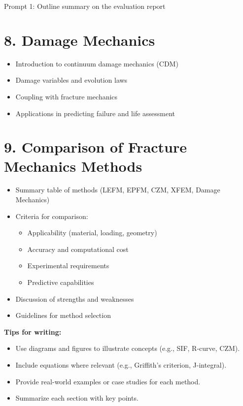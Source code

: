\documentclass[12pt]{article}
\begin{document}
\begin{summarybox}{Prompt 1: Outline summary on the evaluation report}
\section*{8. Damage Mechanics }
\begin{itemize}
    \item Introduction to continuum damage mechanics (CDM)
    \item Damage variables and evolution laws
    \item Coupling with fracture mechanics
    \item Applications in predicting failure and life assessment
\end{itemize}

\section*{9. Comparison of Fracture Mechanics Methods }
\begin{itemize}
    \item Summary table of methods (LEFM, EPFM, CZM, XFEM, Damage Mechanics)
    \item Criteria for comparison:
    \begin{itemize}
        \item Applicability (material, loading, geometry)
        \item Accuracy and computational cost
        \item Experimental requirements
        \item Predictive capabilities
    \end{itemize}
    \item Discussion of strengths and weaknesses
    \item Guidelines for method selection
\end{itemize}
\vspace{1em}
\textbf{Tips for writing:}
\vspace{1em}
\begin{itemize}
    \item Use diagrams and figures to illustrate concepts (e.g., SIF, R-curve, CZM).
    \item Include equations where relevant (e.g., Griffith’s criterion, J-integral).
    \item Provide real-world examples or case studies for each method.
    \item Summarize each section with key points.
\end{itemize}
\end{summarybox}
\end{document}
